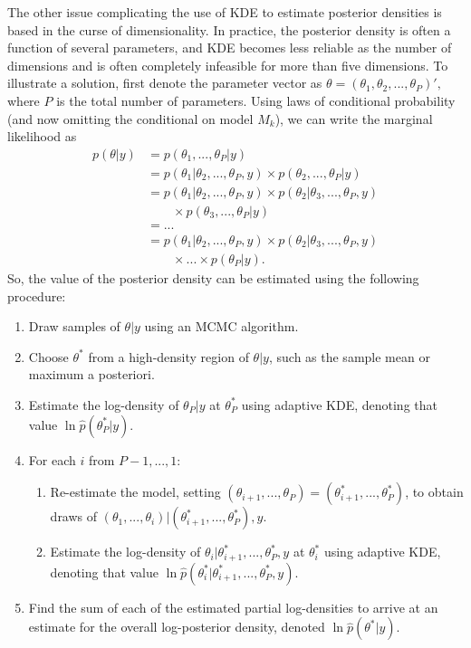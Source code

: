\documentclass[twocolumn]{article}
\begin{document}
The other issue complicating the use of KDE to estimate posterior densities is based in the curse of dimensionality. In practice, the posterior density is often a function of several parameters, and KDE becomes less reliable as the number of dimensions and is often completely infeasible for more than five dimensions. To illustrate a solution, first denote the parameter vector as $\theta = (\theta_1, \theta_2, ..., \theta_P)',$ where $P$ is the total number of parameters. Using laws of conditional probability (and now omitting the conditional on model $M_k$), we can write the marginal likelihood as
\begin{subequations}
\begin{align}
	p(\theta|y)
	&= p(\theta_1, ..., \theta_P|y) \\
	&= p(\theta_1|\theta_2, ..., \theta_P, y)\times p(\theta_2, ..., \theta_P|y) \\
	&= p(\theta_1|\theta_2, ..., \theta_P, y)\times p(\theta_2|\theta_3, ..., \theta_P, y) \\ &\qquad\times p(\theta_3, ..., \theta_P|y) \\
	&= ... \\
	&= p(\theta_1|\theta_2, ..., \theta_P, y)\times p(\theta_2|\theta_3, ..., \theta_P, y)\\ &\qquad\times ...\times p(\theta_P|y).
\end{align}
\end{subequations}
So, the value of the posterior density can be estimated using the following procedure:
\begin{enumerate}[noitemsep]
	\item Draw samples of $\theta|y$ using an MCMC algorithm.
	\item Choose $\theta^*$ from a high-density region of $\theta|y$, such as the sample mean or maximum a posteriori.
	\item Estimate the log-density of $\theta_P|y$ at $\theta_P^*$ using adaptive KDE, denoting that value $\ln \hat{p}(\theta_P^*|y)$.
	\item For each $i$ from $P-1, ..., 1$:
		\begin{enumerate}
			\item Re-estimate the model, setting $(\theta_{i+1}, ..., \theta_P) = (\theta_{i+1}^*, ..., \theta_P^*)$, to obtain draws of $(\theta_1, ..., \theta_i)|(\theta_{i+1}^*, ..., \theta_P^*), y$.
			\item Estimate the log-density of $\theta_i|\theta_{i+1}^*, ..., \theta_P^*, y$ at $\theta_i^*$ using adaptive KDE, denoting that value $\ln \hat{p}(\theta_i^*|\theta_{i+1}^*, ..., \theta_P^*, y)$.
		\end{enumerate}
	\item Find the sum of each of the estimated partial log-densities to arrive at an estimate for the overall log-posterior density, denoted $\ln \hat{p}(\theta^*|y)$.
\end{enumerate}
\end{document}

